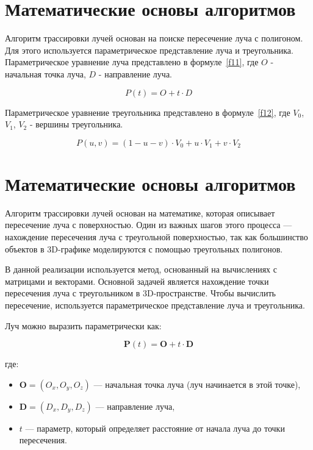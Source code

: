 
\section{Математические основы алгоритмов}
Алгоритм трассировки лучей основан на поиске пересечение луча с полигоном. Для этого используется параметрическое представление луча и треугольника.
Параметрическое уравнение луча представлено в формуле~\ref{f11}, где $O$ - начальная точка луча, $D$ - направление луча.

\begin{equation}
P(t) = O + t \cdot D
\label{f11}
\end{equation}

Параметрическое уравнение треугольника представлено в формуле~\ref{f12}, где $V_{0}$, $V_{1}$, $V_{2}$  - вершины треугольника.

\begin{equation}
P(u, v) = (1 - u - v) \cdot V_{0} + u \cdot V_{1} + v \cdot V_{2}
\label{f12}
\end{equation}

\section{Математические основы алгоритмов}

Алгоритм трассировки лучей основан на математике, которая описывает пересечение луча с поверхностью. Один из важных шагов этого процесса — нахождение пересечения луча с треугольной поверхностью, так как большинство объектов в 3D-графике моделируются с помощью треугольных полигонов.

В данной реализации используется метод, основанный на вычислениях с матрицами и векторами. Основной задачей является нахождение точки пересечения луча с треугольником в 3D-пространстве. Чтобы вычислить пересечение, используется параметрическое представление луча и треугольника.

Луч можно выразить параметрически как:

\begin{equation}
\mathbf{P}(t) = \mathbf{O} + t \cdot \mathbf{D}
\end{equation}

где:
\begin{itemize}
    \item \(\mathbf{O} = (O_x, O_y, O_z)\) — начальная точка луча (луч начинается в этой точке),
    \item \(\mathbf{D} = (D_x, D_y, D_z)\) — направление луча,
    \item \(t\) — параметр, который определяет расстояние от начала луча до точки пересечения.
\end{itemize}

